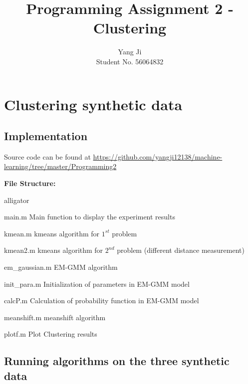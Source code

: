 \documentclass[12pt]{article}
\title{Programming Assignment 2 - Clustering}
\date{}
\author{\fontsize{12}{12}\selectfont Yang Ji\\ \fontsize{12}{12}\selectfont Student No. 56064832}
\begin{document}
\maketitle
\section{\fontsize{16}{16}\selectfont Clustering synthetic data}
\subsection{Implementation}
Source code can be found at \url{https://github.com/yangji12138/machine-learning/tree/master/Programming2}

\vspace{1em}
\noindent\textbf{File Structure:}

\begin{labeling}{alligator}
\item [main.m] Main function to display the experiment results
\item [kmean.m] kmeans algorithm for \(1^{st}\) problem
\item [kmean2.m] kmeans algorithm for \(2^{nd}\) problem (different distance measurement)
\item [em\_gaussian.m] EM-GMM algorithm
\item [init\_para.m] Initialization of parameters in EM-GMM model
\item [calcP.m] Calculation of probability function in EM-GMM model
\item [meanshift.m] meanshift algorithm 
\item [plotf.m] Plot Clustering results
\end{labeling}

\subsection{Running algorithms on the three synthetic data}
\end{document}
